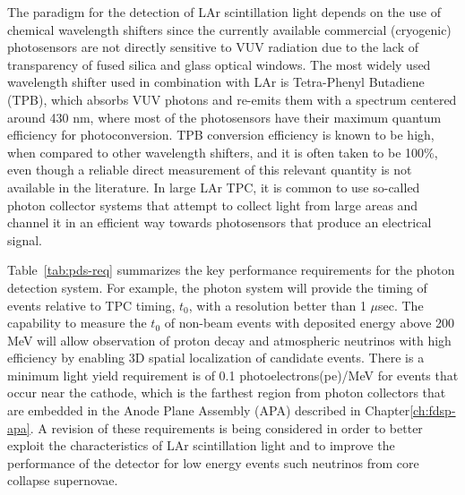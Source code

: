 The paradigm for the detection of LAr scintillation light depends on the use of 
chemical wavelength shifters since the currently available commercial (cryogenic) photosensors are not 
directly sensitive to VUV radiation due to the lack of transparency of fused silica and 
glass optical windows. The most widely used wavelength shifter used in 
combination with LAr is Tetra-Phenyl Butadiene (TPB), which absorbs VUV photons 
and re-emits them with a spectrum centered around 430 nm, where most of the 
photosensors have their maximum quantum efficiency for photoconversion. TPB conversion efficiency 
is known to be high, when compared to other wavelength shifters, and 
it is often taken to be 100\%, even though a reliable direct measurement of this 
relevant quantity is not available in the literature. 
In large LAr TPC, it is common to use so-called photon collector systems that attempt to 
collect light from large areas and channel it in an efficient way towards  
photosensors that produce an electrical signal.


Table~\ref{tab:pds-req} summarizes the key performance requirements for the photon detection system.
For example, the photon system will provide the timing of events relative to TPC timing, $t_0$, with a 
resolution better than 1 $\mu$sec.  The capability to measure the $t_0$ of non-beam events with deposited 
energy above 200 MeV will allow observation of proton decay and atmospheric neutrinos with high 
efficiency by enabling 3D spatial localization of candidate events. 
There is a minimum light yield requirement is of  0.1 photoelectrons(pe)/MeV for events that occur near the cathode, which is the farthest region from photon collectors that are embedded in the Anode Plane Assembly (APA) described in Chapter\ref{ch:fdsp-apa}. 
A revision of these requirements is being considered in order to better exploit the 
characteristics of LAr scintillation light and to improve the performance of the detector for low energy events such neutrinos from core collapse supernovae.


